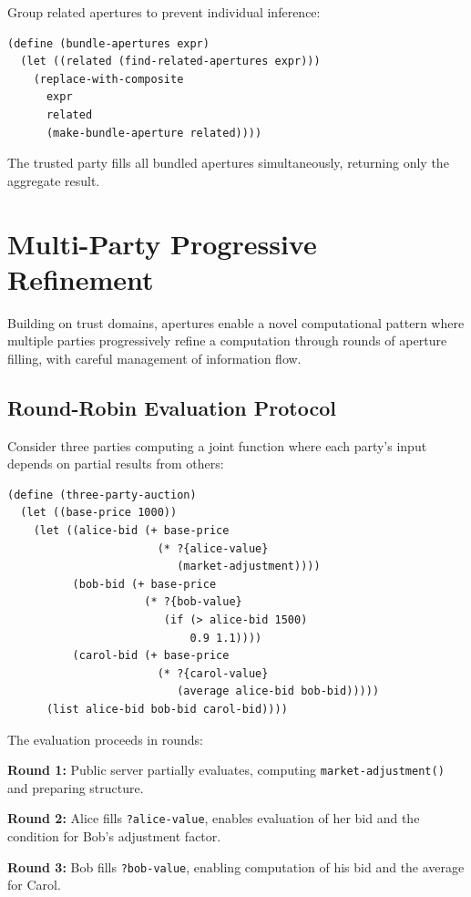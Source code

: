 \documentclass[12pt]{article}
\begin{document}
Group related apertures to prevent individual inference:

\begin{lstlisting}
(define (bundle-apertures expr)
  (let ((related (find-related-apertures expr)))
    (replace-with-composite 
      expr 
      related 
      (make-bundle-aperture related))))
\end{lstlisting}

The trusted party fills all bundled apertures simultaneously, returning only the aggregate result.

\section{Multi-Party Progressive Refinement}

Building on trust domains, apertures enable a novel computational pattern where multiple parties progressively refine a computation through rounds of aperture filling, with careful management of information flow.

\subsection{Round-Robin Evaluation Protocol}

Consider three parties computing a joint function where each party's input depends on partial results from others:

\begin{lstlisting}
(define (three-party-auction)
  (let ((base-price 1000))
    (let ((alice-bid (+ base-price 
                       (* ?{alice-value} 
                          (market-adjustment))))
          (bob-bid (+ base-price 
                     (* ?{bob-value} 
                        (if (> alice-bid 1500) 
                            0.9 1.1))))
          (carol-bid (+ base-price
                       (* ?{carol-value}
                          (average alice-bid bob-bid)))))
      (list alice-bid bob-bid carol-bid))))
\end{lstlisting}

The evaluation proceeds in rounds:

\textbf{Round 1:} Public server partially evaluates, computing \texttt{market-adjustment()} and preparing structure.

\textbf{Round 2:} Alice fills \texttt{?alice-value}, enables evaluation of her bid and the condition for Bob's adjustment factor.

\textbf{Round 3:} Bob fills \texttt{?bob-value}, enabling computation of his bid and the average for Carol.
\end{document}
